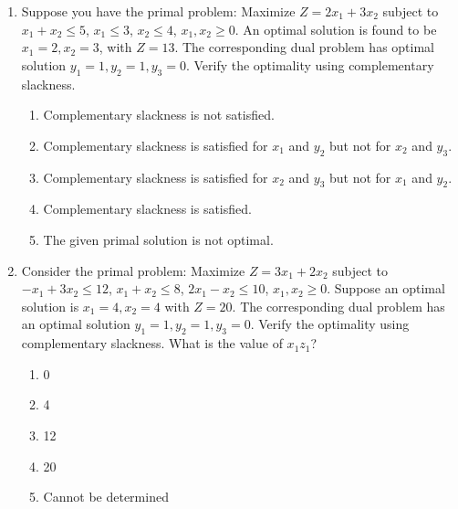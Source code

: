 \documentclass{article}%
\begin{document}
\begin{enumerate}
\begin{enumerate}
\item Complementary slackness is not relevant to verifying optimality.%
\item If a primal constraint is binding, the corresponding dual variable must be zero.%
\item If a primal variable is positive, the corresponding dual constraint must be binding.%
\item If a primal constraint is non-binding, the corresponding dual variable must be positive.%
\item Complementary slackness states that either a primal constraint is binding or the corresponding dual variable is zero, but not both.%
\end{enumerate}%
\vspace{1em}%
\item Suppose you have the primal problem: Maximize $Z = 2x_1 + 3x_2$ subject to $x_1 + x_2 \le 5$, $x_1 \le 3$, $x_2 \le 4$, $x_1, x_2 \ge 0$.  An optimal solution is found to be $x_1 = 2, x_2 = 3$, with $Z = 13$.  The corresponding dual problem has optimal solution $y_1 = 1, y_2 = 1, y_3 = 0$. Verify the optimality using complementary slackness.%
\begin{enumerate}%
\item Complementary slackness is not satisfied.%
\item Complementary slackness is satisfied for $x_1$ and $y_2$ but not for $x_2$ and $y_3$.%
\item Complementary slackness is satisfied for $x_2$ and $y_3$ but not for $x_1$ and $y_2$.%
\item Complementary slackness is satisfied.%
\item The given primal solution is not optimal.%
\end{enumerate}%
\vspace{1em}%
\item Consider the primal problem: Maximize $Z = 3x_1 + 2x_2$ subject to $-x_1 + 3x_2 \le 12$, $x_1 + x_2 \le 8$, $2x_1 - x_2 \le 10$, $x_1, x_2 \ge 0$.  Suppose an optimal solution is $x_1 = 4, x_2 = 4$ with $Z = 20$. The corresponding dual problem has an optimal solution $y_1 = 1, y_2 = 1, y_3 = 0$. Verify the optimality using complementary slackness. What is the value of $x_1 z_1$?%
\begin{enumerate}%
\item 0%
\item 4%
\item 12%
\item 20%
\item Cannot be determined%
\end{enumerate}%
\vspace{1em}%
\end{enumerate}
\end{document}
